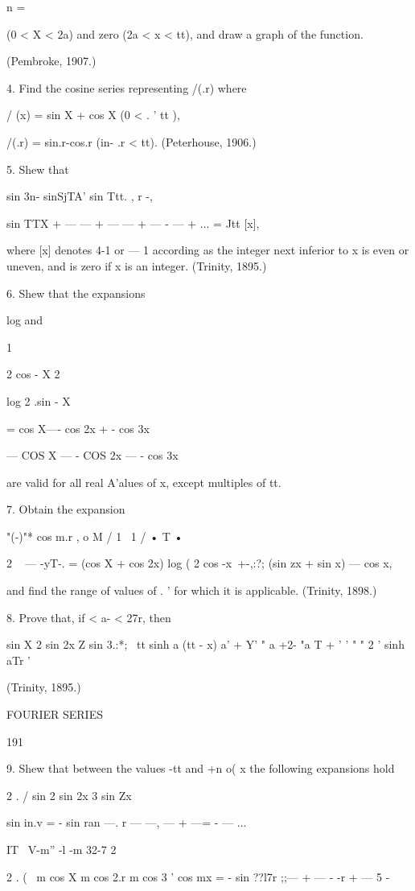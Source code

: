 {n = \

(0 < X < 2a) and zero (2a < x < tt), and draw a graph of the function.

(Pembroke, 1907.)

4. Find the cosine series representing /(.r) where

/ (x) = sin X + cos X (0 < . ' tt ),

/(.r) = sin.r-cos.r (in- .r < tt). (Peterhouse, 1906.)

5. Shew that

sin 3n- sinSjTA' sin Ttt. , r -,

sin TTX + — — + — — + — - — + ... = Jtt [x],

where [x] denotes 4-1 or — 1 according as the integer next inferior to
x is even or uneven, and is zero if x is an integer. (Trinity, 1895.)

6. Shew that the expansions

log and

1

2 cos - X 2

log 2 .sin - X

= cos X—- cos 2x + - cos 3x

— COS X — - COS 2x — - cos 3x

are valid for all real A'alues of x, except multiples of tt.

7. Obtain the expansion

"(-)"* cos m.r , o M / 1 \ 1 / • T • \

2 ~ — -yT-. = (cos X + cos 2x) log ( 2 cos -x\ +-,:?; (sin zx + sin x)
— cos x,

and find the range of values of . ' for which it is applicable.
(Trinity, 1898.)

8. Prove that, if < a- < 27r, then

sin X 2 sin 2x Z sin 3.:*; \ tt sinh a (tt - x) a' + Y' " a +2- "a T +
' ' " " 2 ' sinh aTr '

(Trinity, 1895.)

FOURIER SERIES

191

9. Shew that between the values -tt and +n o( x the following
expansions hold

2 . / sin 2 sin 2x 3 sin Zx

sin in.v = - sin ran —. r — —, — + —= - — ...

IT \ V-m'' -l -m 32-7 2

2 . ( \ m cos X m cos 2.r m cos 3 ' cos mx = - sin ??l7r ;;— + — - -r
+ — 5 -

}
